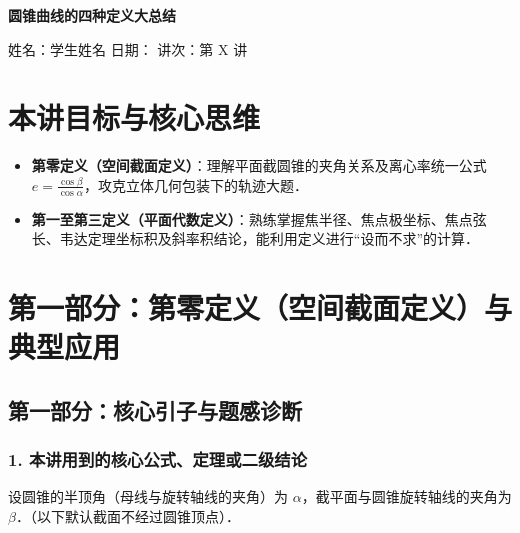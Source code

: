 \documentclass[11pt,a4paper]{ctexart}
\newcommand{\lessoninfo}[4]{%
  \begin{center}
    {\LARGE\bfseries #1}\par
    \vspace{0.8em}
    {\small 姓名：#2 \quad 日期：#3 \quad 讲次：#4}
  \end{center}
  \vspace{0.6em}
}
\begin{document}
\lessoninfo{圆锥曲线的四种定义大总结}{学生姓名}{\blank{2.6cm}}{第 X 讲}

\section{本讲目标与核心思维}
\begin{itemize}[itemsep=0.3em]
  \item \textbf{第零定义（空间截面定义）}：理解平面截圆锥的夹角关系及离心率统一公式 $e = \frac{\cos\beta}{\cos\alpha}$，攻克立体几何包装下的轨迹大题．
  \item \textbf{第一至第三定义（平面代数定义）}：熟练掌握焦半径、焦点极坐标、焦点弦长、韦达定理坐标积及斜率积结论，能利用定义进行“设而不求”的计算．
\end{itemize}

\section{第一部分：第零定义（空间截面定义）与典型应用}

\subsection*{第一部分：核心引子与题感诊断}

\subsubsection*{1. 本讲用到的核心公式、定理或二级结论}

设圆锥的半顶角（母线与旋转轴线的夹角）为 $\alpha$，截平面与圆锥旋转轴线的夹角为 $\beta$．（以下默认截面不经过圆锥顶点）．
\end{document}
